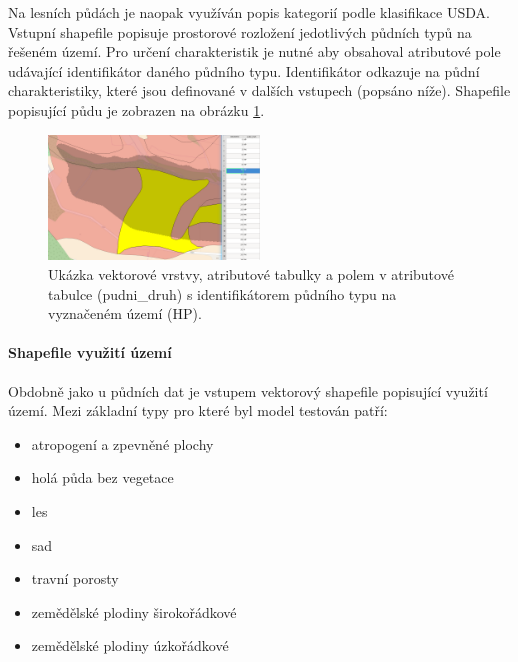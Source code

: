 Na lesních půdách je naopak využíván popis kategorií podle klasifikace USDA.
Vstupní shapefile popisuje prostorové rozložení jedotlivých půdních typů na řešeném území. Pro určení charakteristik je nutné aby obsahoval atributové pole udávající identifikátor daného půdního typu. Identifikátor odkazuje na půdní charakteristiky, které jsou definované v dalších vstupech (popsáno níže). Shapefile popisující půdu je zobrazen na obrázku \ref{fig:bykovicepuda}.
\begin{figure}
  \centering
  \includegraphics[width=0.5\textwidth]{./img/pudnityp.png}
  \caption{Ukázka vektorové vrstvy, atributové tabulky a polem v atributové tabulce (pudni\_druh) s identifikátorem půdního typu na vyznačeném území (HP).}
  \label{fig:bykovicepuda}
\end{figure}



\paragraph{Shapefile využití území} \label{sec:vstupvegetace}

Obdobně jako u půdních dat je vstupem vektorový shapefile popisující využití území. Mezi základní typy pro které byl model testován patří:
\begin{itemize} \itemsep 0pt
  \item atropogení a zpevněné plochy  
  \item holá půda bez vegetace
  \item les
  \item sad
  \item travní porosty
  \item zemědělské plodiny širokořádkové
  \item zemědělské plodiny úzkořádkové
\end{itemize}

